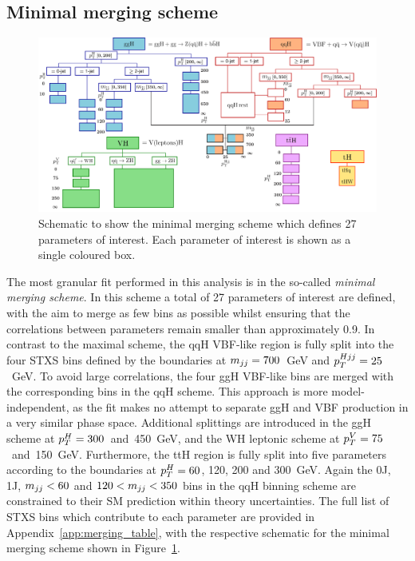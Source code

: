 \FloatBarrier

\subsection{Minimal merging scheme}
\begin{figure}[htb!]
  \centering
  \includegraphics[width=.9\linewidth]{Figures/app_merging_schemes/allSTXSbins_minimal.pdf}
  \caption[Schematic of the minimal merging scheme]
  {
    Schematic to show the minimal merging scheme which defines 27 parameters of interest. Each parameter of interest is shown as a single coloured box.
  }
  \label{fig:minimal_scheme}
\end{figure}

The most granular fit performed in this analysis is in the so-called \textit{minimal merging scheme}. In this scheme a total of 27 parameters of interest are defined, with the aim to merge as few bins as possible whilst ensuring that the correlations between parameters remain smaller than approximately 0.9. In contrast to the maximal scheme, the qqH VBF-like region is fully split into the four STXS bins defined by the boundaries at $m_{jj}=700$~GeV and $p_T^{Hjj}=25$~GeV. To avoid large correlations, the four ggH VBF-like bins are merged with the corresponding bins in the qqH scheme. This approach is more model-independent, as the fit makes no attempt to separate ggH and VBF production in a very similar phase space. Additional splittings are introduced in the ggH scheme at $p_T^H=300$~and~450~GeV, and the WH leptonic scheme at $p_T^V=75$~and~150~GeV. Furthermore, the ttH region is fully split into five parameters according to the boundaries at $p_T^H=60$, 120, 200 and 300~GeV. Again the 0J, 1J, $m_{jj}<60$ and $120<m_{jj}<350$ bins in the qqH binning scheme are constrained to their SM prediction within theory uncertainties. The full list of STXS bins which contribute to each parameter are provided in Appendix~\ref{app:merging_table}, with the respective schematic for the minimal merging scheme shown in Figure~\ref{fig:minimal_scheme}.


